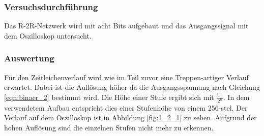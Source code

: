 \documentclass[12pt,a4paper]{article}
\begin{document}
\subsubsection*{Versuchsdurchführung}

Das R-2R-Netzwerk wird mit acht Bits aufgebaut und das Ausgangssignal mit dem Oszilloskop untersucht.

\subsubsection*{Auswertung}

Für den Zeitleichenverlauf wird wie im Teil zuvor eine Treppen-artiger Verlauf erwartet. Dabei ist die Auflösung höher da die Ausgangsspannung nach Gleichung \ref{eqn:binaer_2} bestimmt wird. Die Höhe einer Stufe ergibt sich mit $\frac{\text{U}_0}{2^\text{n}}$. In dem verwendetem Aufbau entspricht dies einer Stufenhöhe von einem 256-stel. Der Verlauf auf dem Oszilloskop ist in Abbildung \ref{fig:1_2_1} zu sehen. Aufgrund der hohen Auflösung sind die einzelnen Stufen nicht mehr zu erkennen.
\end{document}

